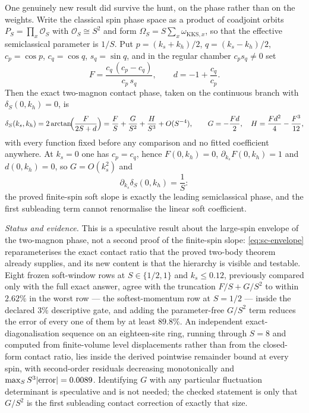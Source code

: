 \begin{observation}
\label{obs:sc-envelope}
One genuinely new result did survive the hunt, on the phase rather than on the
weights. Write the classical spin phase space as a product of coadjoint orbits
$P_S = \prod_x \mathcal{O}_S$ with $\mathcal{O}_S \cong S^2$ and form
$\Omega_S = S\sum_x \omega_{\mathrm{KKS},x}$, so that the effective
semiclassical parameter is $1/S$. Put $p = (k_s+k_h)/2$, $q = (k_s-k_h)/2$,
$c_p = \cos p$, $c_q = \cos q$, $s_q = \sin q$, and in the regular chamber
$c_p s_q \neq 0$ set
\begin{equation}
  F = \frac{c_q\,(c_p - c_q)}{c_p\,s_q},
  \qquad
  d = -1 + \frac{c_q}{c_p} .
\end{equation}
Then the exact two-magnon contact phase, taken on the continuous branch with
$\delta_S(0,k_h) = 0$, is
\begin{equation}
  \delta_S(k_s,k_h) = 2\arctan\!\Bigl(\frac{F}{2S+d}\Bigr)
  = \frac{F}{S} + \frac{G}{S^2} + \frac{H}{S^3} + O(S^{-4}),
  \qquad
  G = -\frac{Fd}{2},
  \quad
  H = \frac{Fd^2}{4} - \frac{F^3}{12},
  \label{eq:sc-envelope}
\end{equation}
with every function fixed before any comparison and no fitted coefficient
anywhere. At $k_s = 0$ one has $c_p = c_q$, hence $F(0,k_h) = 0$,
$\partial_{k_s}F(0,k_h) = 1$ and $d(0,k_h) = 0$, so $G = O(k_s^2)$ and
\begin{equation}
  \partial_{k_s}\delta_S(0,k_h) = \frac{1}{S} :
\end{equation}
the proved finite-spin soft slope is exactly the leading semiclassical phase,
and the first subleading term cannot renormalise the linear soft coefficient.
\end{observation}

\emph{Status and evidence.} This is a speculative result about the large-spin
envelope of the two-magnon phase, not a second proof of the finite-spin slope:
\eqref{eq:sc-envelope} reparameterises the exact contact ratio that the proved
two-body theorem already supplies, and its new content is that the hierarchy
is visible and testable. Eight frozen soft-window rows at $S \in \{1/2,1\}$
and $k_s \le 0.12$, previously compared only with the full exact answer, agree
with the truncation $F/S + G/S^2$ to within $2.62\%$ in the worst row — the
softest-momentum row at $S = 1/2$ — inside the declared $3\%$ descriptive
gate, and adding the parameter-free $G/S^2$ term reduces the error of every
one of them by at least $89.8\%$. An independent exact-diagonalisation
sequence on an eighteen-site ring, running through $S = 8$ and computed from
finite-volume level displacements rather than from the closed-form contact
ratio, lies inside the derived pointwise remainder bound at every spin, with
second-order residuals decreasing monotonically and $\max_S S^3\lvert \text{error}\rvert
= 0.0089$. Identifying $G$ with any particular fluctuation determinant is
speculative and is not needed; the checked statement is only that $G/S^2$ is
the first subleading contact correction of exactly that size.

